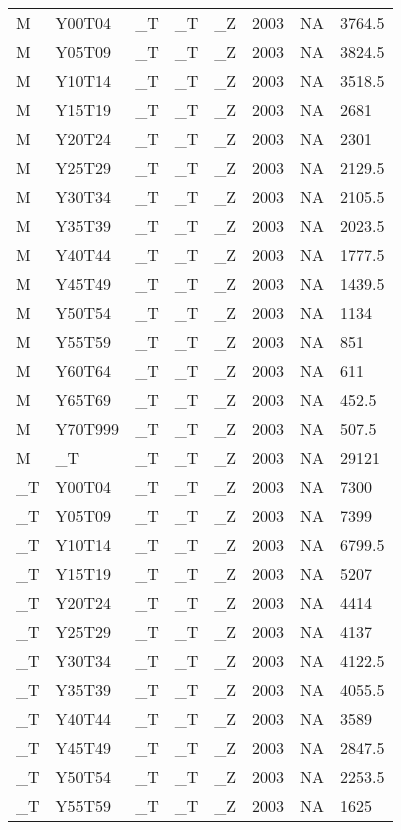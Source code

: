 \begin{longtable}[t]{llllllll}
\addlinespace
M & Y00T04 & \_T & \_T & \_Z & 2003 & NA & 3764.5\\
M & Y05T09 & \_T & \_T & \_Z & 2003 & NA & 3824.5\\
M & Y10T14 & \_T & \_T & \_Z & 2003 & NA & 3518.5\\
M & Y15T19 & \_T & \_T & \_Z & 2003 & NA & 2681\\
M & Y20T24 & \_T & \_T & \_Z & 2003 & NA & 2301\\
\addlinespace
M & Y25T29 & \_T & \_T & \_Z & 2003 & NA & 2129.5\\
M & Y30T34 & \_T & \_T & \_Z & 2003 & NA & 2105.5\\
M & Y35T39 & \_T & \_T & \_Z & 2003 & NA & 2023.5\\
M & Y40T44 & \_T & \_T & \_Z & 2003 & NA & 1777.5\\
M & Y45T49 & \_T & \_T & \_Z & 2003 & NA & 1439.5\\
\addlinespace
M & Y50T54 & \_T & \_T & \_Z & 2003 & NA & 1134\\
M & Y55T59 & \_T & \_T & \_Z & 2003 & NA & 851\\
M & Y60T64 & \_T & \_T & \_Z & 2003 & NA & 611\\
M & Y65T69 & \_T & \_T & \_Z & 2003 & NA & 452.5\\
M & Y70T999 & \_T & \_T & \_Z & 2003 & NA & 507.5\\
\addlinespace
M & \_T & \_T & \_T & \_Z & 2003 & NA & 29121\\
\_T & Y00T04 & \_T & \_T & \_Z & 2003 & NA & 7300\\
\_T & Y05T09 & \_T & \_T & \_Z & 2003 & NA & 7399\\
\_T & Y10T14 & \_T & \_T & \_Z & 2003 & NA & 6799.5\\
\_T & Y15T19 & \_T & \_T & \_Z & 2003 & NA & 5207\\
\addlinespace
\_T & Y20T24 & \_T & \_T & \_Z & 2003 & NA & 4414\\
\_T & Y25T29 & \_T & \_T & \_Z & 2003 & NA & 4137\\
\_T & Y30T34 & \_T & \_T & \_Z & 2003 & NA & 4122.5\\
\_T & Y35T39 & \_T & \_T & \_Z & 2003 & NA & 4055.5\\
\_T & Y40T44 & \_T & \_T & \_Z & 2003 & NA & 3589\\
\addlinespace
\_T & Y45T49 & \_T & \_T & \_Z & 2003 & NA & 2847.5\\
\_T & Y50T54 & \_T & \_T & \_Z & 2003 & NA & 2253.5\\
\_T & Y55T59 & \_T & \_T & \_Z & 2003 & NA & 1625\\

\end{longtable}
